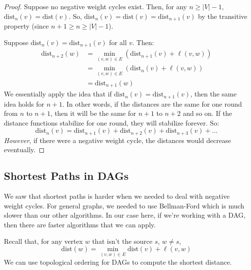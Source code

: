 \documentclass[letterpaper]{article}
\begin{document}
\begin{mdframed}[]
    \begin{proof}
        Suppose no negative weight cycles exist. Then, for any $n \geq |V| - 1$, $\text{dist}_{n}(v) = \text{dist}(v)$. So, $\text{dist}_{n}(v) = \text{dist}(v) = \text{dist}_{n + 1}(v)$ by the transitive property (since $n + 1 \geq n \geq |V| - 1$). 

        \bigskip 

        Suppose $\text{dist}_{n}(v) = \text{dist}_{n + 1}(v)$ for all $v$. Then: 
        \begin{equation*}
            \begin{aligned}
                \text{dist}_{n + 2}(w) &= \min_{(v, w) \in E} (\text{dist}_{n + 1}(v) + \ell(v, w)) \\ 
                    &= \min_{(v, w) \in E} (\text{dist}_{n}(v) + \ell(v, w)) \\
                    &= \text{dist}_{n + 1}(w)
            \end{aligned}
        \end{equation*}
        We essentially apply the idea that if $\text{dist}_{n}(v) = \text{dist}_{n + 1}(v)$, then the same idea holds for $n + 1$. In other words, if the distances are the same for one round from $n$ to $n + 1$, then it will be the same for $n + 1$ to $n + 2$ and so on. If the distance functions stabilize for one round, they will stabilize forever. So: 
        \[\text{dist}_{n}(v) = \text{dist}_{n + 1}(v) + \text{dist}_{n + 2}(v) + \text{dist}_{n + 3}(v) + \dots\]
        \emph{However}, if there were a negative weight cycle, the distances would decrease eventually. 
    \end{proof}
\end{mdframed}

\subsection{Shortest Paths in DAGs}
We saw that shortest paths is harder when we needed to deal with negative weight cycles. For general graphs, we needed to use Bellman-Ford which is much slower than our other algorithms. In our case here, if we're working with a DAG, then there are faster algorithms that we can apply. 

\bigskip 

Recall that, for any vertex $w$ that isn't the source $s$, $w \neq s$,
\[\text{dist}(w) = \min_{(v, w) \in E} \text{dist}(v) + \ell(v, w)\]
We can use topological ordering for DAGs to compute the shortest distance.
\end{document}
